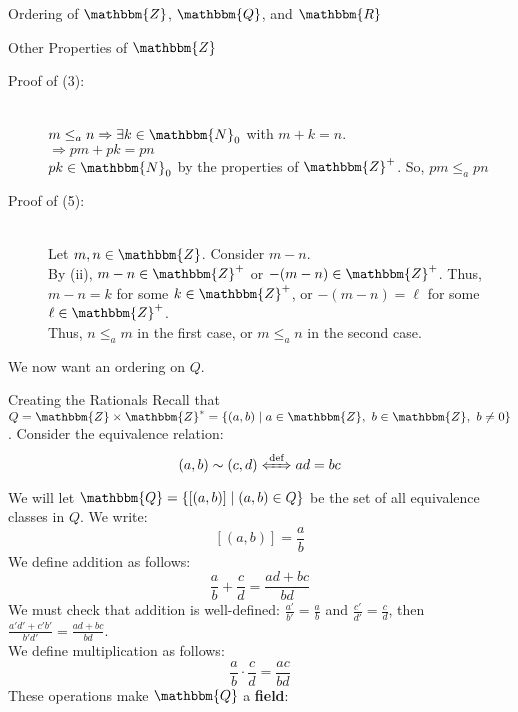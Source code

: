 \documentclass[10pt]{extarticle}
\newcommand{\N}{\mathbbm{N}}
\newcommand{\Q}{\mathbbm{Q}}
\newcommand{\Z}{\mathbbm{Z}}
\newcommand{\R}{\mathbbm{R}}
\begin{document}
\begin{problem}{Ordering of $\Z$, $\Q$, and $\R$}
\begin{problem}{Other Properties of $\Z$}
\begin{enumerate}[(\arabic*)]
      \end{enumerate}
      \tcblower
      \begin{description}
        \item[Proof of (3):]\hfill\\
          $m\leq_a n \Rightarrow \exists k\in \N_0$ with $m+k = n$.\\
          $\Rightarrow pm + pk = pn$\\
          $pk\in \N_0$ by the properties of $\Z^+$. So, $pm \leq_a pn$
        \item[Proof of (5):]\hfill\\
          Let $m,n\in\Z$. Consider $m-n$.\\
          By (ii), $m-n\in\Z^+$ or $-(m-n)\in\Z^+$. Thus, $m-n = k$ for some $k\in\Z^+$, or $-(m-n) = \ell$ for some $\ell\in\Z^+$.\\
          Thus, $n\leq_a m$ in the first case, or $m\leq_a n$ in the second case.
      \end{description}
    \end{problem}
    We now want an ordering on $Q$.
    \begin{problem}{Creating the Rationals}
      Recall that $Q = \Z \times \Z^* = \{(a,b) \mid a\in \Z,~b\in \Z,~b\neq 0\}$. Consider the equivalence relation:
      \[
        (a,b)\sim(c,d) \xLeftrightarrow{\text{def}} ad = bc
      \] 
      We will let $\Q = \{[(a,b)]\mid (a,b) \in Q\}$ be the set of all equivalence classes in $Q$. We write:
      \[
        [(a,b)] = \frac{a}{b}
      \] 
      We define addition as follows:
      \[
        \frac{a}{b} + \frac{c}{d} = \frac{ad + bc}{bd}
      \] 
      We must check that addition is well-defined: $\frac{a'}{b'} = \frac{a}{b}$ and $\frac{c'}{d'} = \frac{c}{d}$, then $\frac{a'd' + c'b'}{b'd'} = \frac{ad+bc}{bd}$.\\

      We define multiplication as follows:
      \[
        \frac{a}{b} \cdot \frac{c}{d} = \frac{ac}{bd}
      \] 
      These operations make $\Q$ a \textbf{field}:
  \end{problem}
    \end{problem}
\end{document}
